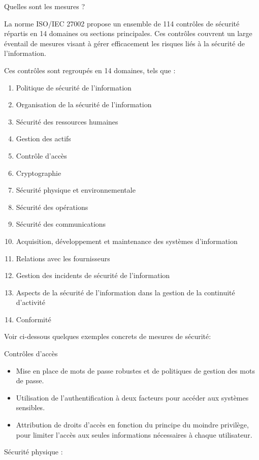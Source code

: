 Quelles sont les mesures ?

La norme ISO/IEC 27002 propose un ensemble de 114 contrôles de sécurité répartis en 14 domaines ou sections principales. Ces contrôles couvrent un large éventail de mesures visant à gérer efficacement les risques liés à la sécurité de l'information.

Ces contrôles sont regroupés en 14 domaines, tels que :

\begin{enumerate}
   \item Politique de sécurité de l'information
   \item Organisation de la sécurité de l'information
   \item Sécurité des ressources humaines
   \item Gestion des actifs
   \item Contrôle d’accès
   \item Cryptographie
   \item Sécurité physique et environnementale
   \item Sécurité des opérations
   \item Sécurité des communications
   \item Acquisition, développement et maintenance des systèmes d’information
   \item Relations avec les fournisseurs
   \item Gestion des incidents de sécurité de l'information
   \item Aspects de la sécurité de l'information dans la gestion de la continuité d’activité
   \item Conformité
 \end{enumerate}

Voir ci-dessous quelques exemples concrets de mesures de sécurité:

Contrôles d’accès

\begin{itemize}
\item Mise en place de mots de passe robustes et de politiques de gestion des mots de passe.
\item Utilisation de l’authentification à deux facteurs pour accéder aux systèmes sensibles.
\item Attribution de droits d’accès en fonction du principe du moindre privilège, pour limiter l’accès aux seules informations nécessaires à chaque utilisateur.
 \end{itemize}

Sécurité physique :

